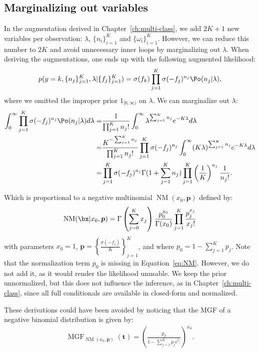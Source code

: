 \subsection{Marginalizing out variables}
\label{sec:marg_multiclass}
In the augmentation derived in Chapter~\ref{ch:multi-class}, we add $2K + 1$ new variables per observation: $\lambda$, $\{n_i\}_{i=1}^K$ and $\{\omega_i\}_{i=1}^K$.
However, we can reduce this number to $2K$ and avoid unnecessary inner loops by marginalizing out $\lambda$.
When deriving the augmentations, one ends up with the following augmented likelihood:
\begin{align}
    p(y=k, \{n_j\}_{j=1}^K, \lambda|\{f_j\}_{j=1}^K) = \sigma(f_k) \prod_{j=1}^K \sigma(-f_j)^{n_j} \Po (n_j|\lambda),
\end{align}
where we omitted the improper prior $1_{[0,\infty)}$ on $\lambda$.
We can marginalize out $\lambda$:
\begin{align}
    \int_{0}^\infty \prod_{j=1}^K \sigma(-f_j)^{n_j} \Po (n_j|\lambda)d\lambda =& \frac{1}{\prod_{j=1}^K n_j!}\int_{0}^\infty \lambda^{\sum_{j=1}^K n_j}e^{-K\lambda}d\lambda \nonumber\\
    =& \frac{K^{-\sum_{j=1}^K n_j}}{\prod_{j=1}^K n_j!}\prod_{j=1}^K \sigma(-f_j)^{n_j} \int_{0}^\infty (K\lambda)^{\sum_{j=1}^K n_j}e^{-K\lambda}d\lambda \nonumber\\
    =& \prod_{j=1}^K\sigma(-f_j)^{n_j}\Gamma(1 + \sum_{j=1}^K n_j) \prod_{j=1}^K \left(\frac{1}{K}\right)^{n_j}\frac{1}{n_j!}. \label{eq:NM}
\end{align}

Which is proportional to a negative multinomial $\operatorname{NM}(x_0, \boldsymbol{p})$ defined by:
\begin{align*}
    \operatorname{NM}(\bx|x_0,\boldsymbol{p}) = \Gamma\left(\sum_{j=0}^K x_j\right) \frac{p_0^{x_0}}{\Gamma(x_0)}\prod_{j=1}^K \frac{p_j^{x_j}}{x_j!}   
\end{align*}
with parameters $x_0=1$, $\boldsymbol{p}=\left\{\frac{\sigma(-f_j)}{K}\right\}_{j=1}^K$, and where $p_0 = 1 - \sum_{j=1}^K p_j$.
Note that the normalization term $p_0$ is missing in Equation~\eqref{eq:NM}.
However, we do not add it, as it would render the likelihood unusable.
We keep the prior unnormalized, but this does not influence the inference, as in Chapter~\ref{ch:multi-class}, since all full conditionals are available in closed-form and normalized.

These derivations could have been avoided by noticing that the \ac{MGF} of a negative binomial distribution is given by:
\begin{align*}
    \operatorname{MGF}_{\operatorname{NM}(x_0,\boldsymbol{p})}(\boldsymbol{t}) = \left(\frac{p_0}{1-\sum_{j=1}^K p_j e^{t_j}}\right)^{x_0}.
\end{align*}


